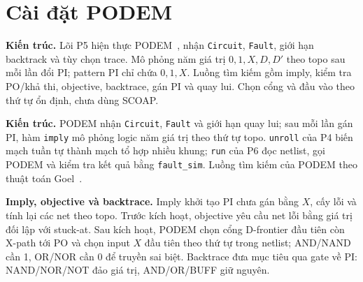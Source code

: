 \chapter{Cài đặt PODEM}
\label{sec:p5-cai-dat-podem}
\textbf{Kiến trúc.}
Lõi P5 hiện thực PODEM~\cite{p3_goel1981}, nhận \texttt{Circuit},
\texttt{Fault}, giới hạn backtrack và tùy chọn trace. Mô phỏng năm giá trị
$0,1,X,D,D'$ theo topo sau mỗi lần đổi PI; pattern PI chỉ chứa $0,1,X$.
Luồng tìm kiếm gồm imply, kiểm tra PO/khả thi, objective, backtrace,
gán PI và quay lui. Chọn cổng và đầu vào theo thứ tự ổn định, chưa dùng SCOAP.

\textbf{Kiến trúc.}
PODEM nhận \texttt{Circuit}, \texttt{Fault} và giới hạn quay lui; sau mỗi
lần gán PI, hàm \texttt{imply} mô phỏng logic năm giá trị theo thứ tự topo.
\texttt{unroll} của P4 biến mạch tuần tự thành mạch tổ hợp nhiều khung;
\texttt{run} của P6 đọc netlist, gọi PODEM và kiểm tra kết quả bằng
\texttt{fault\_sim}. Luồng tìm kiếm của PODEM theo thuật toán
Goel~\cite{p5_goel1981}.

\begin{center}
\end{center}

\textbf{Imply, objective và backtrace.}
Imply khởi tạo PI chưa gán bằng $X$, cấy lỗi và tính lại các net theo topo.
Trước kích hoạt, objective yêu cầu net lỗi bằng giá trị đối lập với
stuck-at. Sau kích hoạt, PODEM chọn cổng D-frontier đầu tiên còn X-path tới
PO và chọn input $X$ đầu tiên theo thứ tự trong netlist; AND/NAND cần 1,
OR/NOR cần 0 để truyền sai biệt. Backtrace đưa mục tiêu qua gate về PI:
NAND/NOR/NOT đảo giá trị, AND/OR/BUFF giữ nguyên.


